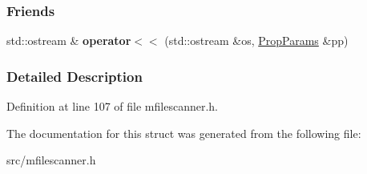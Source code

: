 \subsubsection*{Friends}
\begin{DoxyCompactItemize}
\item 
\hypertarget{struct_prop_params_a07f867f42393cf7131f5e70de7d1b5b8}{}std\+::ostream \& {\bfseries operator$<$$<$} (std\+::ostream \&os, \hyperlink{struct_prop_params}{Prop\+Params} \&pp)\label{struct_prop_params_a07f867f42393cf7131f5e70de7d1b5b8}

\end{DoxyCompactItemize}


\subsubsection{Detailed Description}


Definition at line 107 of file mfilescanner.\+h.



The documentation for this struct was generated from the following file\+:\begin{DoxyCompactItemize}
\item 
src/mfilescanner.\+h\end{DoxyCompactItemize}
